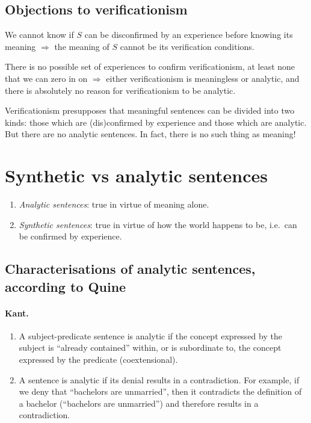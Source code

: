 \subsection*{Objections to verificationism}

\begin{objection}
We cannot know if $S$ can be disconfirmed by an experience before knowing its meaning $\Rightarrow$ the meaning of $S$ cannot be its verification conditions.
\end{objection}

\begin{objection}
There is no possible set of experiences to confirm verificationism, at least none that we can zero in on $\Rightarrow$ either verificationism is meaningless or analytic, and there is absolutely no reason for verificationism to be analytic.
\end{objection}

\begin{objection}
Verificationism presupposes that meaningful sentences can be divided into two kinds: those which are (dis)confirmed by experience and those which are analytic. But there are no analytic sentences. In fact, there is no such thing as meaning!
\end{objection}

\section{Synthetic vs analytic sentences}

\begin{definition}\leavevmode
\begin{enumerate}[label=\roman*.]
  \item \emph{Analytic sentences}: true in virtue of meaning alone.
  \item \emph{Synthetic sentences}: true in virtue of how the world happens to be, i.e.\ can be confirmed by experience.
\end{enumerate}
\end{definition}

\subsection*{Characterisations of analytic sentences, according to Quine}

\paragraph{Kant.}
\begin{enumerate}
  \item A subject-predicate sentence is analytic if the concept expressed by the subject is ``already contained'' within, or is subordinate to, the concept expressed by the predicate (coextensional).
  \item A sentence is analytic if its denial results in a contradiction. For example, if we deny that ``bachelors are unmarried'', then it contradicts the definition of a bachelor (``bachelors are unmarried'') and therefore results in a contradiction.
\end{enumerate}

